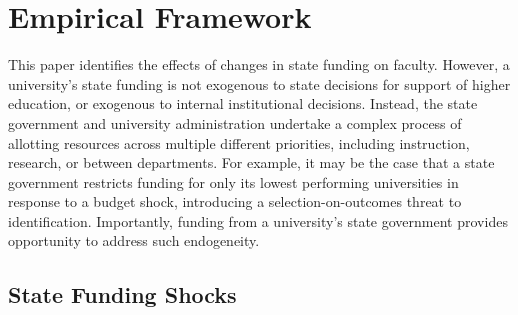 \section{Empirical Framework}
\label{sec:empirics}

This paper identifies the effects of changes in state funding on faculty.
However, a university's state funding is not exogenous to state decisions for support of higher education, or exogenous to internal institutional decisions.
Instead, the state government and university administration undertake a complex process of allotting resources across multiple different priorities, including instruction, research, or between departments.
For example, it may be the case that a state government restricts funding for only its lowest performing universities in response to a budget shock, introducing a selection-on-outcomes threat to identification. 
Importantly, funding from a university's state government provides opportunity to address such endogeneity.

\subsection{State Funding Shocks}
\label{sec:approp-shocks}

